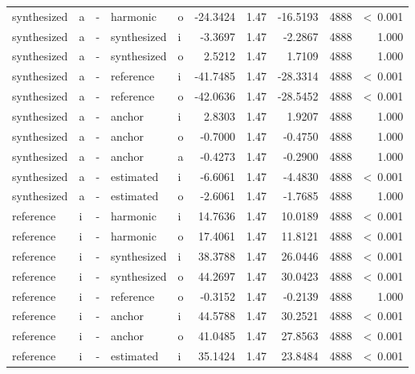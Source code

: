 \documentclass[a4paper,man,hidelinks,floatsintext]{apa7}
\begin{document}
\begin{table}[!htbp]
\begin{adjustbox}{max size={\columnwidth}{\textheight}}
\begin{tabular}{llrllrrrrr}
synthesized & a     & - & harmonic    & o     &   -24.3424 & 1.47 & -16.5193 & 4888 &  \textless~0.001 \\
synthesized & a     & - & synthesized & i     &    -3.3697 & 1.47 &  -2.2867 & 4888 &            1.000 \\
synthesized & a     & - & synthesized & o     &     2.5212 & 1.47 &   1.7109 & 4888 &            1.000 \\
synthesized & a     & - & reference   & i     &   -41.7485 & 1.47 & -28.3314 & 4888 &  \textless~0.001 \\
synthesized & a     & - & reference   & o     &   -42.0636 & 1.47 & -28.5452 & 4888 &  \textless~0.001 \\
synthesized & a     & - & anchor      & i     &     2.8303 & 1.47 &   1.9207 & 4888 &            1.000 \\
synthesized & a     & - & anchor      & o     &    -0.7000 & 1.47 &  -0.4750 & 4888 &            1.000 \\
synthesized & a     & - & anchor      & a     &    -0.4273 & 1.47 &  -0.2900 & 4888 &            1.000 \\
synthesized & a     & - & estimated   & i     &    -6.6061 & 1.47 &  -4.4830 & 4888 &  \textless~0.001 \\
synthesized & a     & - & estimated   & o     &    -2.6061 & 1.47 &  -1.7685 & 4888 &            1.000 \\
reference   & i     & - & harmonic    & i     &    14.7636 & 1.47 &  10.0189 & 4888 &  \textless~0.001 \\
reference   & i     & - & harmonic    & o     &    17.4061 & 1.47 &  11.8121 & 4888 &  \textless~0.001 \\
reference   & i     & - & synthesized & i     &    38.3788 & 1.47 &  26.0446 & 4888 &  \textless~0.001 \\
reference   & i     & - & synthesized & o     &    44.2697 & 1.47 &  30.0423 & 4888 &  \textless~0.001 \\
reference   & i     & - & reference   & o     &    -0.3152 & 1.47 &  -0.2139 & 4888 &            1.000 \\
reference   & i     & - & anchor      & i     &    44.5788 & 1.47 &  30.2521 & 4888 &  \textless~0.001 \\
reference   & i     & - & anchor      & o     &    41.0485 & 1.47 &  27.8563 & 4888 &  \textless~0.001 \\
reference   & i     & - & estimated   & i     &    35.1424 & 1.47 &  23.8484 & 4888 &  \textless~0.001 \\

\end{tabular}
\end{adjustbox}
\end{table}
\end{document}
